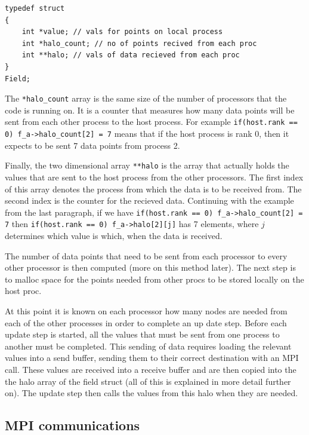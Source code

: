 \documentclass[pdftex,12pt,a4paper]{article}
\begin{document}
\begin{lstlisting}
typedef struct
{
	int *value;	// vals for points on local process
	int *halo_count; // no of points recived from each proc
	int **halo;	// vals of data recieved from each proc	
}
Field;
\end{lstlisting}

The \verb|*halo_count| array is the same size of the number of processors that the code is running on. It is a counter that measures how many data points will be sent from each other process to the host process. For example \verb|if(host.rank == 0) f_a->halo_count[2] = 7| means that if the host process is rank 0, then it expects to be sent 7 data points from process 2.

Finally, the two dimensional array \verb|**halo| is the array that actually holds the values that are sent to the host process from the other processors. The first index of this array denotes the process from which the data is to be received from. The second index is the counter for the recieved data. Continuing with the example from the last paragraph, if we have \verb|if(host.rank == 0) f_a->halo_count[2] = 7| then \verb|if(host.rank == 0) f_a->halo[2][j]| has 7 elements, where $j$ determines which value is which, when the data is received.

The number of data points that need to be sent from each processor to every other processor is then computed (more on this method later). The next step is to malloc space for the points needed from other procs to be stored locally on the host proc.

At this point it is known on each processor how many nodes are needed from each of the other processes in order to complete an up date step. Before each update step is started, all the values that must be sent from one process to another must be completed. This sending of data requires loading the relevant values into a send buffer, sending them to their correct destination with an MPI call. These values are received into a receive buffer and are then copied into the the halo array of the field struct (all of this is explained in more detail further on). The update step then calls the values from this halo when they are needed.




\subsection{MPI communications}
\end{document}
